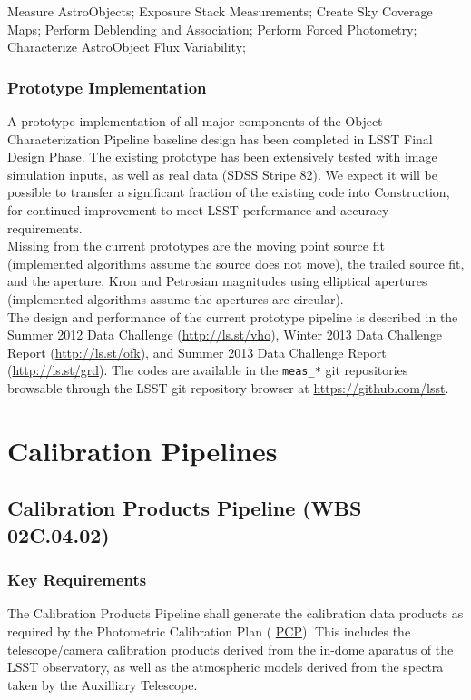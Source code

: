 \documentclass[12pt]{article}
\newcommand{\ds}[2]{{\color{blue} \href{https://docushare.lsstcorp.org/docushare/dsweb/Get/#1}{#2}}\xspace}
\newcommand{\PCP}{\ds{Document-8123}{PCP}}
\newcommand{\wbsCPP}{WBS 02C.04.02}
\begin{document}
Measure AstroObjects; Exposure Stack Measurements;
Create Sky Coverage Maps; Perform Deblending and Association; Perform Forced Photometry; Characterize AstroObject Flux Variability;

\subsubsection{Prototype Implementation}

A prototype implementation of all major components of the Object Characterization Pipeline baseline design has been completed in LSST Final Design Phase. The existing prototype has been extensively tested with image simulation inputs, as well as real data (SDSS Stripe 82). We expect it will be possible to transfer a significant fraction of the existing code into Construction, for continued improvement to meet LSST performance and accuracy requirements.
\\

Missing from the current prototypes are the moving point source fit (implemented algorithms assume the source does not move), the trailed source fit, and the aperture, Kron and Petrosian magnitudes using elliptical apertures (implemented algorithms assume the apertures are circular).
\\

The design and performance of the current prototype pipeline is described in the Summer 2012 Data Challenge (\url{http://ls.st/vho}), Winter 2013 Data Challenge Report (\url{http://ls.st/ofk}), and Summer 2013 Data Challenge Report (\url{http://ls.st/grd}). The codes are available in the {\tt meas\_*} git repositories browsable through the LSST git repository browser at \url{https://github.com/lsst}.

\clearpage

\section{Calibration Pipelines}

\subsection{Calibration Products Pipeline (\wbsCPP)}

\subsubsection{Key Requirements}

The Calibration Products Pipeline shall generate the calibration data products as required by the Photometric Calibration Plan (\PCP). This includes the telescope/camera calibration products derived from the in-dome aparatus of the LSST observatory, as well as the atmospheric models derived from the spectra taken by the Auxilliary Telescope.
\end{document}
